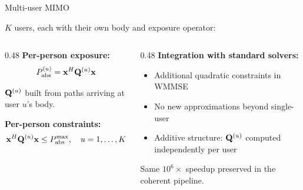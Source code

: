 \begin{frame}{Multi-user MIMO}

  $K$ users, each with their own body and exposure operator:

  \vspace{6pt}
  \begin{columns}[T]
    \begin{column}{0.48\textwidth}
      \textbf{Per-person exposure:}
      \[
        P_{\mathrm{abs}}^{(u)} = \mathbf{x}^H \mathbf{Q}^{(u)} \mathbf{x}
      \]

      $\mathbf{Q}^{(u)}$ built from paths arriving at user $u$'s body.

      \vspace{8pt}
      \textbf{Per-person constraints:}
      \[
        \mathbf{x}^H \mathbf{Q}^{(u)} \mathbf{x} \le P_{\mathrm{abs}}^{\max},
        \quad u = 1,\ldots,K
      \]
    \end{column}

    \begin{column}{0.48\textwidth}
      \textbf{Integration with standard solvers:}
      \begin{itemize}
        \item Additional quadratic constraints in WMMSE
        \item No new approximations beyond single-user
        \item Additive structure: $\mathbf{Q}^{(u)}$ computed independently per user
      \end{itemize}

      \vspace{8pt}
      {\footnotesize Same $10^6\times$ speedup preserved in the coherent pipeline.}
    \end{column}
  \end{columns}
\end{frame}

